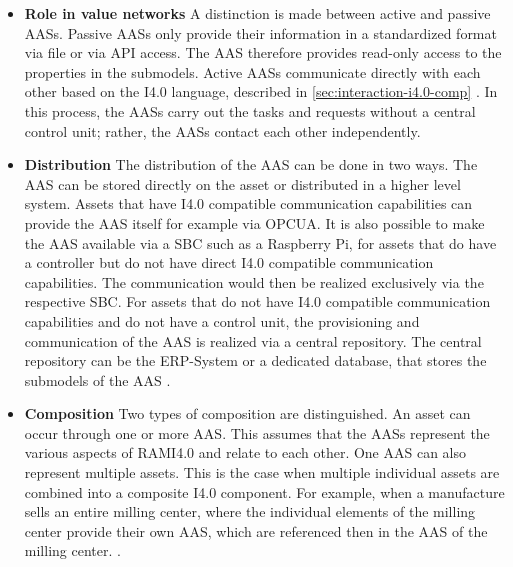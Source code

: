\begin{itemize}
    \item [] \textbf{Role in value networks} A distinction is made between active and passive \ac{AAS}s. Passive \ac{AAS}s only provide their information in a standardized format via file or via \ac{API} access. The \ac{AAS} therefore provides read-only access to the properties in the submodels. Active \ac{AAS}s communicate directly with each other based on the \ac{I4.0} language, described in \ref{sec:interaction-i4.0-comp} \cite[p. 19]{Bedenbender2019VerwaltungschalePraxis}. In this process, the \ac{AAS}s carry out the tasks and requests without a central control unit; rather, the \ac{AAS}s contact each other independently. 
    
    \item [] \textbf{Distribution} The distribution of the \ac{AAS} can be done in two ways. The \ac{AAS} can be stored directly on the asset or distributed in a higher level system. Assets that have \ac{I4.0} compatible communication capabilities can provide the \ac{AAS} itself for example via \ac{OPCUA}. It is also possible to make the \ac{AAS} available via a \ac{SBC} such as a Raspberry Pi, for assets that do have a controller but do not have direct \ac{I4.0} compatible communication capabilities. The communication would then be realized exclusively via the respective \ac{SBC}.  For assets that do not have \ac{I4.0} compatible communication capabilities and do not have a control unit, the provisioning and communication of the \ac{AAS} is realized via a central repository. The central repository can be the \ac{ERP}-System or a dedicated database, that stores the submodels of the \ac{AAS} \cite[p. 18]{Bedenbender2019VerwaltungschalePraxis}.
    
    \item [] \textbf{Composition} Two types of composition are distinguished. An asset can occur through one or more \ac{AAS}. This assumes that the \ac{AAS}s represent the various aspects of \ac{RAMI4.0} and relate to each other. One \ac{AAS} can also represent multiple assets. This is the case when multiple individual assets are combined into a composite \ac{I4.0} component. For example, when a manufacture sells an entire milling center, where the individual elements of the milling center provide their own \ac{AAS}, which are referenced then in the \ac{AAS} of the milling center. \cite[p. 29]{Adolphs2016StructureComponent}.
 \end{itemize}

